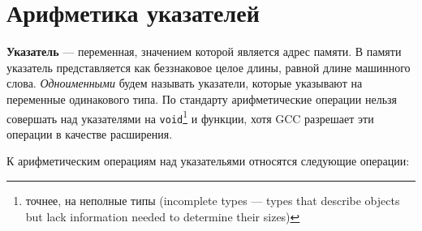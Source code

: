 \section{Арифметика указателей}
\label{sec:ptr_arithm}
\textbf{Указатель} --- переменная, значением которой является адрес памяти.
В памяти указатель представляется как беззнаковое целое длины, равной длине
машинного слова.
\textit{Одноименными} будем называть указатели, которые указывают на переменные
одинакового типа. По стандарту арифметические операции нельзя совершать над 
указателями на \verb|void|\footnote{точнее, на неполные типы (incomplete types ---
types that describe objects but lack information needed to determine their sizes)}
и функции, хотя GCC разрешает эти операции в качестве расширения.

К арифметическим операциям над указательями относятся следующие операции:
